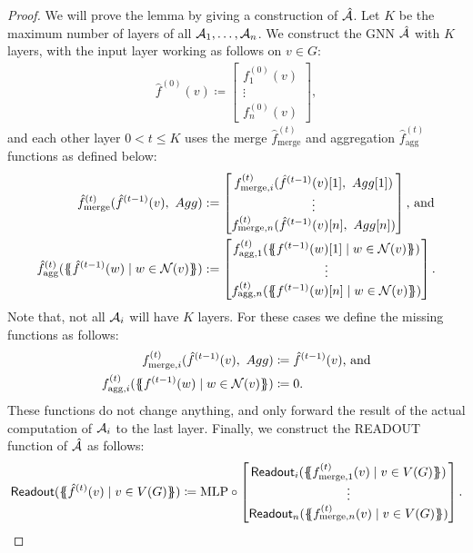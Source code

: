 \begin{proof}
    We will prove the lemma by giving a construction of $\hat{\mathcal{A}}$. Let $K$ be the maximum number of layers of all $\mathcal{A}_1, \dots, \mathcal{A}_n$. We construct the GNN $\hat{\mathcal{A}}$ with $K$ layers, with the input layer working as follows on $v \in G$:
    \begin{align*}
        \hat{f}^{(0)}(v) \coloneqq \begin{bmatrix}
            f^{(0)}_1(v)\\
            \vdots\\
            f^{(0)}_n(v)
        \end{bmatrix},
    \end{align*}
    and each other layer $0 < t \leq K$ uses the merge $\hat{f}^{(t)}_{\text{merge}}$ and aggregation $\hat{f}^{(t)}_{\text{agg}}$ functions as defined below:
    \begin{align*}
        \hat{f}^{(t)}_{\text{merge}} (\hat{f}^{(t-1)}(v), \ Agg) &:= \begin{bmatrix}
            f^{(t)}_{\text{merge}, i}(\hat{f}^{(t-1)}(v)[1],\ Agg[1])\\
            \vdots\\
            f^{(t)}_{\text{merge}, n}(\hat{f}^{(t-1)}(v)[n],\ Agg[n])
        \end{bmatrix}\text{, and}\\
        \hat{f}^{(t)}_{\text{agg}}(\MSopen \hat{f}^{(t-1)}(w) \mid w \in \mathcal{N}(v) \MSclose ) &:= \begin{bmatrix}
            f^{(t)}_{\text{agg}, 1}(\MSopen f^{(t-1)}(w)[1] \mid w \in \mathcal{N}(v) \MSclose)\\
            \vdots\\
            f^{(t)}_{\text{agg}, n}(\MSopen f^{(t-1)}(w)[n] \mid w \in \mathcal{N}(v) \MSclose)
        \end{bmatrix}.
    \end{align*}
    Note that, not all $\mathcal{A}_i$ will have $K$ layers. For these cases we define the missing functions as follows:
    \begin{align*}
        f^{(t)}_{\text{merge}, i}(\hat{f}^{(t-1)}(v), \ Agg) &\coloneqq \hat{f}^{(t-1)}(v)\text{, and}\\
        f^{(t)}_{\text{agg}, i}(\{\!\!\{ f^{(t-1)}(w) \mid w \in \mathcal{N}(v) \}\!\!\}) &\coloneqq 0.
    \end{align*}
    These functions do not change anything, and only forward the result of the actual computation of $\mathcal{A}_i$ to the last layer. Finally, we construct the \textsf{READOUT} function of $\hat{\mathcal{A}}$ as follows:
    \begin{align*}
        \textsf{Readout}(\MSopen \hat{f}^{(t)}(v) \mid v \in V(G) \MSclose) \coloneqq \mlp \circ \begin{bmatrix}
            \textsf{Readout}_i(\MSopen f^{(t)}_{\text{merge}, 1}(v) \mid v \in V(G) \MSclose)\\
            \vdots\\
            \textsf{Readout}_n(\MSopen f^{(t)}_{\text{merge}, n}(v) \mid v \in V(G) \MSclose)
        \end{bmatrix}.
    \end{align*}
\end{proof}

